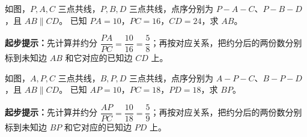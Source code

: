 \documentclass{exam-zh}
\begin{document}

\begin{problem}[points=10]
  \noindent
  \begin{minipage}[t]{\dimexpr\linewidth-60mm-6mm\relax}
    \vspace{0pt}
    如图，$P,A,C$ 三点共线，$P,B,D$ 三点共线，点序分别为 $P-A-C$、$P-B-D$，且 $AB\parallel CD$。
已知 $PA=10$，$PC=16$，$CD=24$，求 $AB$。
    \begin{hintbox}
\textbf{起步提示：}先计算并约分 $\dfrac{PA}{PC}=\dfrac{10}{16}=\dfrac{5}{8}$；再按对应关系，把约分后的两份数分别标到未知边 $AB$ 和它对应的已知边 $CD$ 上。\end{hintbox}

  \end{minipage}\hfill
  \begin{diagramcoltikz}{60mm}{先看平行边方向，再判断 A 字型或 8 字型及对应边。}
  }
  \end{diagramcoltikz}
  \par\medskip
  \answerarea[42mm]
\end{problem}



\begin{problem}[points=10]
  \noindent
  \begin{minipage}[t]{\dimexpr\linewidth-60mm-6mm\relax}
    \vspace{0pt}
    如图，$A,P,C$ 三点共线，$B,P,D$ 三点共线，点序分别为 $A-P-C$、$B-P-D$，且 $AB\parallel CD$。
已知 $AP=10$，$PC=18$，$PD=18$，求 $BP$。
    \begin{hintbox}
\textbf{起步提示：}先计算并约分 $\dfrac{AP}{PC}=\dfrac{10}{18}=\dfrac{5}{9}$；再按对应关系，把约分后的两份数分别标到未知边 $BP$ 和它对应的已知边 $PD$ 上。\end{hintbox}

  \end{minipage}\hfill
  \begin{diagramcoltikz}{60mm}{先看平行边方向，再判断 A 字型或 8 字型及对应边。}
  }
  \end{diagramcoltikz}
  \par\medskip
  \answerarea[42mm]
\end{problem}
\end{document}
